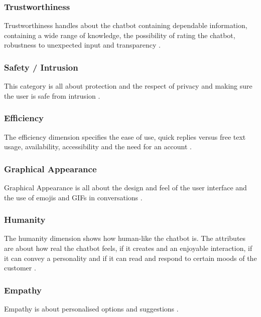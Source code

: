 \subsubsection{Trustworthiness}
Trustworthiness handles about the chatbot containing dependable information, containing a wide range of knowledge, the possibility of rating the chatbot, robustness to unexpected input and transparency \citep*{Muizzah2021, Verkeyn2018}.

\subsubsection{Safety / Intrusion}
This category is all about protection and the respect of privacy and making sure the user is safe from intrusion \citep*{Muizzah2021, Verkeyn2018}.\\

\subsubsection{Efficiency}
The efficiency dimension specifies the ease of use, quick replies versus free text usage, availability, accessibility and the need for an account \citep*{Muizzah2021, Verkeyn2018}.\\

\subsubsection{Graphical Appearance}
Graphical Appearance is all about the design and feel of the user interface and the use of emojis and GIFs in conversations \citep*{Muizzah2021, Verkeyn2018}.\\

\subsubsection{Humanity}
The humanity dimension shows how human-like the chatbot is. The attributes are about how real the chatbot feels, if it creates and an enjoyable interaction, if it can convey a personality and if it can read and respond to certain moods of the customer \citep*{Muizzah2021, Verkeyn2018}.\\

\subsubsection{Empathy}
Empathy is about personalised options and suggestions \citep*{Muizzah2021, Verkeyn2018}.\\

